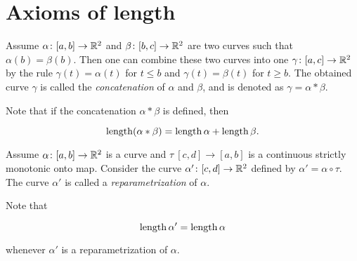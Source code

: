 \section{Axioms of length}



Assume $\alpha\colon[a,b]\to \mathbb{R}^2$ and $\beta\:[b,c]\z\to \RR^2$ are two curves such that $\alpha(b)=\beta(b)$.
Then one can combine these two curves into one $\gamma\:[a,c]\z\to \RR^2$ by the rule $\gamma(t)=\alpha(t)$ for $t\le b$ and $\gamma(t)=\beta(t)$ for $t\ge b$.
The obtained curve $\gamma$ is called the 
\emph{concatenation} of $\alpha$ and $\beta$, and is denoted as $\gamma=\alpha*\beta$.

Note that if the concatenation $\alpha*\beta$ is defined, then

\[\mathop{\rm length}\nolimits(\alpha*\beta)=\mathop{\rm length}\nolimits\alpha+\mathop{\rm length}\nolimits\beta.\]



Assume $\alpha\colon[a,b]\to \mathbb{R}^2$ is a curve and $\tau\:[c,d]\to [a,b]$ is a continuous strictly monotonic onto map.
Consider the curve $\alpha'\colon[c,d]\to \mathbb{R}^2$ defined by $\alpha'=\alpha\circ\tau$.
The curve $\alpha'$ is called a \emph{reparametrization} of $\alpha$.

Note that 

\[\mathop{\rm length}\nolimits\alpha'=\mathop{\rm length}\nolimits\alpha\]

whenever $\alpha'$ is a reparametrization of $\alpha$.









